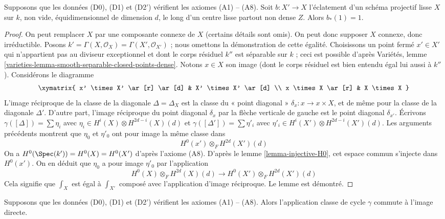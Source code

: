 \begin{lemma}
\label{lemma-pushforward-blowup}
Supposons que les données (D0), (D1) et (D2') vérifient les axiomes (A1) -- (A8).
Soit $b : X' \to X$ l'éclatement d'un schéma projectif lisse $X$
sur $k$, non vide, équidimensionnel de dimension $d$,
le long d'un centre lisse partout non dense $Z$. Alors $b_*(1) = 1$.
\end{lemma}

\begin{proof}
On peut remplacer $X$ par une composante connexe de $X$ (certains détails
sont omis). On peut donc supposer $X$ connexe, donc irréductible.
Posons $k' = \Gamma(X, \mathcal{O}_X) = \Gamma(X', \mathcal{O}_{X'})$ ;
nous omettons la démonstration de cette égalité. Choisissons un point fermé $x' \in X'$
qui n'appartient pas au diviseur exceptionnel et dont le corps résiduel
$k''$ est séparable sur $k$ ; ceci est possible d'après
Variétés, lemme \ref{varieties-lemma-smooth-separable-closed-points-dense}.
Notons $x \in X$ son image (dont le corps résiduel est bien entendu
égal lui aussi à $k''$). Considérons le diagramme
$$
\xymatrix{
x' \times X' \ar[r] \ar[d] & X' \times X' \ar[d] \\
x \times X \ar[r] & X \times X
}
$$
L'image réciproque de la classe de la diagonale $\Delta = \Delta_X$ est la classe du
« point diagonal » $\delta_x : x \to x \times X$, et de même pour la classe de
la diagonale $\Delta'$. D'autre part, l'image réciproque du point diagonal $\delta_x$
par la flèche verticale de gauche est le point diagonal $\delta_{x'}$.
Écrivons $\gamma([\Delta]) = \sum \eta_i$ avec
$\eta_i \in H^i(X) \otimes H^{2d - i}(X)(d)$ et
$\gamma([\Delta']) = \sum \eta'_i$ avec
$\eta'_i \in H^i(X') \otimes H^{2d - i}(X')(d)$.
Les arguments précédents montrent que $\eta_0$ et $\eta'_0$ ont pour image la même
classe dans
$$
H^0(x') \otimes_F H^{2d}(X')(d)
$$
On a $H^0(\Spec(k')) = H^0(X) = H^0(X')$ d'après l'axiome (A8).
D'après le lemme \ref{lemma-injective-H0}, cet espace commun s'injecte
dans $H^0(x')$. On en déduit que $\eta_0$ a pour image $\eta'_0$ par l'application
$$
H^0(X) \otimes_F H^{2d}(X)(d)
\longrightarrow
H^0(X') \otimes_F H^{2d}(X')(d)
$$
Cela signifie que $\int_X$ est égal à $\int_{X'}$ composé avec
l'application d'image réciproque. Le lemme est démontré.
\end{proof}

\begin{lemma}
\label{lemma-done}
Supposons que les données (D0), (D1) et (D2') vérifient les axiomes (A1) -- (A8).
Alors l'application classe de cycle $\gamma$ commute à l'image directe.
\end{lemma}

